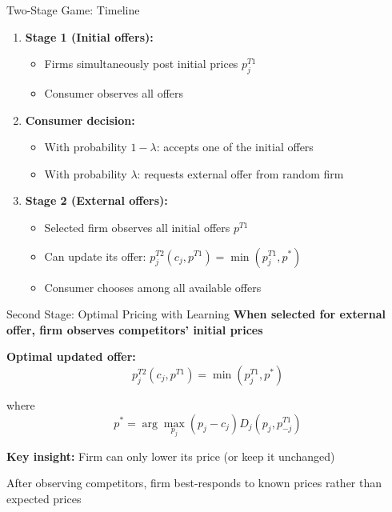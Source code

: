 \documentclass[10pt,aspectratio=169]{beamer}
\begin{document}
\begin{frame}{Two-Stage Game: Timeline}
\begin{enumerate}
    \item \textbf{Stage 1 (Initial offers):}
    \begin{itemize}
        \item Firms simultaneously post initial prices $p^{T1}_j$
        \item Consumer observes all offers
    \end{itemize}
    
    \vspace{0.3cm}
    
    \item \textbf{Consumer decision:}
    \begin{itemize}
        \item With probability $1-\lambda$: accepts one of the initial offers
        \item With probability $\lambda$: requests external offer from random firm
    \end{itemize}
    
    \vspace{0.3cm}
    
    \item \textbf{Stage 2 (External offers):}
    \begin{itemize}
        \item Selected firm observes all initial offers $p^{T1}$
        \item Can update its offer: $p^{T2}_j(c_j, p^{T1}) = \min(p^{T1}_j, p^*)$
        \item Consumer chooses among all available offers
    \end{itemize}
\end{enumerate}
\end{frame}

\begin{frame}{Second Stage: Optimal Pricing with Learning}
\textbf{When selected for external offer, firm observes competitors' initial prices}

\vspace{0.3cm}

\textbf{Optimal updated offer:}
$$p^{T2}_j(c_j, p^{T1}) = \min(p^{T1}_j, p^*)$$

where
$$p^* = \arg\max_{p_j} (p_j - c_j) D_j(p_j, p^{T1}_{-j})$$

\vspace{0.5cm}

\textbf{Key insight:} Firm can only lower its price (or keep it unchanged)

\vspace{0.3cm}
After observing competitors, firm best-responds to known prices rather than expected prices
\end{frame}
\end{document}
